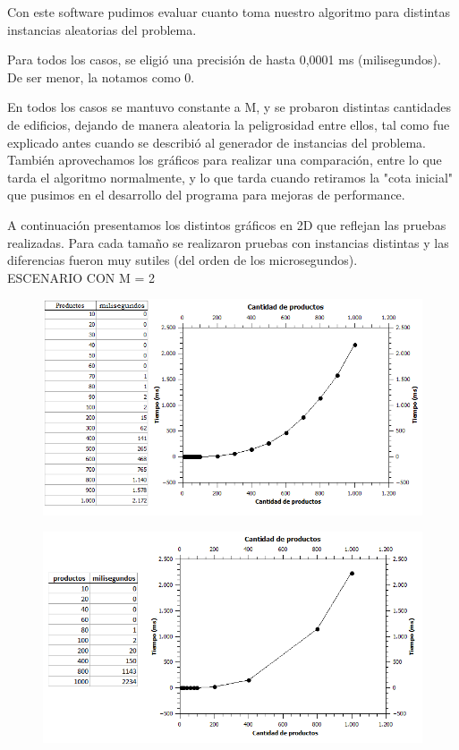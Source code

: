 \documentclass[10pt,a4paper]{article}
\begin{document}
Con este software pudimos evaluar cuanto toma nuestro algoritmo para distintas instancias aleatorias del problema.

Para todos los casos, se eligió una precisión de hasta 0,0001 ms (milisegundos). De ser menor, la notamos como 0.

En todos los casos se mantuvo constante a M, y se probaron distintas cantidades de edificios, dejando de manera aleatoria la peligrosidad entre ellos, tal como fue explicado antes cuando se describió al generador de instancias del problema.
También aprovechamos los gráficos para realizar una comparación, entre lo que tarda el algoritmo normalmente, y lo que tarda cuando retiramos la "cota inicial" que pusimos en el desarrollo del programa para mejoras de performance.

A continuación presentamos los distintos gráficos en 2D que reflejan las pruebas realizadas. Para cada tamaño se realizaron pruebas con instancias distintas y las diferencias fueron muy sutiles (del orden de los microsegundos).\\

\indent ESCENARIO CON M = 2
	\begin{figure}[h]
		\begin{center}
		   \includegraphics[scale=0.50]{experimentos/random/graficos/2.png}
		\end{center}
	\end{figure}
	\begin{figure}[h]
		\begin{center}
		   \includegraphics[scale=0.50]{sincota/graficos/2.png}
		\end{center}
	\end{figure}
\end{document}
